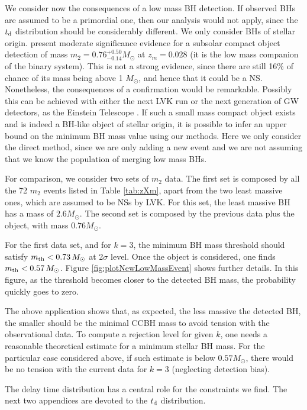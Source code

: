 \documentclass[fleqn,usenatbib,useAMS]{mnras}
\begin{document}
We consider now the consequences of a low mass BH detection. If observed BHs are assumed to be a primordial one, then our analysis would not apply, since the $t_{\rm d}$ distribution should be considerably different. We only consider BHs of stellar origin. \citet{Morras:2023jvb} present moderate significance evidence for a subsolar compact object detection of mass $m_2 = 0.76^{+ 0.50}_{-0.14} M_\odot$ at $z_m = 0.028$ (it is the low mass companion of the binary system). This is not a strong evidence, since there are still 16\% of chance of its mass being above 1 $M_\odot$, and hence that it could be a NS. Nonetheless, the consequences of a confirmation would be remarkable. Possibly this can be achieved  with either the next LVK run or    the next generation of GW detectors, as the Einstein Telescope \cite[e.g.,][]{Wolfe:2023yuu}.  
If such a small mass compact object  exists and is indeed a  BH-like object of stellar origin, it is possible to infer an upper bound on the minimum BH mass value using our methods. Here we only consider the direct method, since we are only adding a new event and we are not assuming that we know the population of merging low mass BHs.

For comparison, we consider two sets of $m_2$ data. The first set is composed by all the 72 $m_2$ events listed in Table \ref{tab:zXm}, apart from the two least massive ones, which are assumed to be NSs by LVK. For this set, the least massive BH has a mass of $2.6 M_\odot$. The second set is composed by the previous data plus the \citet{Morras:2023jvb} object, with mass $0.76 M_\odot$.

For the first data set, and for $k=3$, the minimum BH mass threshold should satisfy $m_{\rm th} < 0.73 \,M_\odot$ at 2$\sigma$ level. Once the \citet{Morras:2023jvb} object is considered, one finds $m_{\rm th} < 0.57 \,M_\odot$. Figure \ref{fig:plotNewLowMassEvent} shows further details. {In this figure, as the threshold becomes closer to the detected BH mass, the probability quickly goes to zero.}

The above application shows that, as expected, the less massive the detected BH, the smaller should be the minimal CCBH mass to avoid tension with the observational data. To compute a rejection level for given $k$, one needs a reasonable theoretical estimate for a minimum stellar BH mass. For the particular case considered above, if such estimate is below $0.57 M_\odot$, there would be no tension with the current data for $k=3$ (neglecting detection bias).

The delay time distribution has a central role for the constraints we find. The next two appendices are devoted to the $t_{\rm d}$ distribution.
\end{document}
